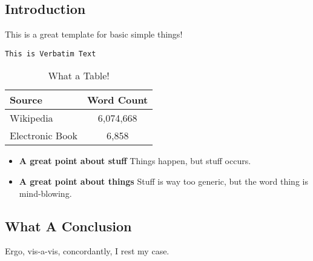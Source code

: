 \documentclass[12pt,a4paper]{article}
\begin{document}
\subsection*{Introduction}

This is a great template for basic simple things!

\begin{verbatim}
This is Verbatim Text
\end{verbatim}

\begin{table}[htbp]
    \caption{What a Table!}
  \centering
  \begin{adjustbox}{width=.5\textwidth}
    \begin{tabular}{lc}
      \toprule
      \textbf{Source} & \textbf{Word Count}\\
      \midrule
      Wikipedia & 6,074,668 \\
      Electronic Book & 6,858 \\
      \bottomrule
    \end{tabular}
    \label{table:cool_table}
  \end{adjustbox}
\end{table}

\begin{itemize}

\item \textbf{A great point about stuff} Things happen, but stuff occurs.

\item \textbf{A great point about things} Stuff is way too generic, but the word thing is mind-blowing.

\end{itemize}

\subsection*{What A Conclusion}

Ergo, vis-a-vis, concordantly, I rest my case. 
\end{document}
